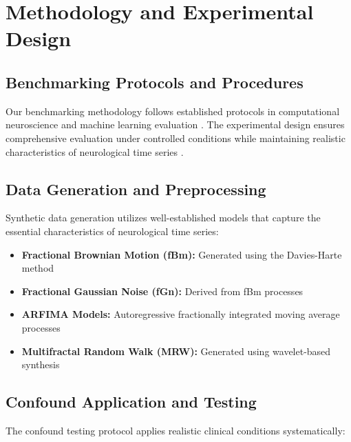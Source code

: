 \section{Methodology and Experimental Design}

\subsection{Benchmarking Protocols and Procedures}

Our benchmarking methodology follows established protocols in computational neuroscience and machine learning evaluation \citep{Harris2020, Virtanen2020}. The experimental design ensures comprehensive evaluation under controlled conditions while maintaining realistic characteristics of neurological time series \citep{McKinney2010}.

\subsection{Data Generation and Preprocessing}

Synthetic data generation utilizes well-established models that capture the essential characteristics of neurological time series:

\begin{itemize}
    \item \textbf{Fractional Brownian Motion (fBm):} Generated using the Davies-Harte method
    \item \textbf{Fractional Gaussian Noise (fGn):} Derived from fBm processes
    \item \textbf{ARFIMA Models:} Autoregressive fractionally integrated moving average processes
    \item \textbf{Multifractal Random Walk (MRW):} Generated using wavelet-based synthesis
\end{itemize}

\subsection{Confound Application and Testing}

The confound testing protocol applies realistic clinical conditions systematically:

